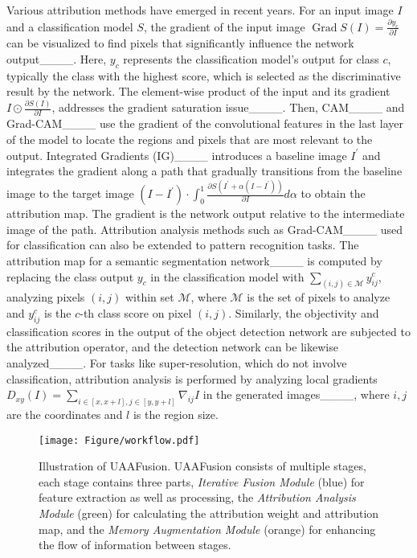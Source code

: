 Various attribution methods have emerged in recent years. 
For an input image $I$ and a classification model $S$, the gradient of the input image $\operatorname{Grad}S(I)=\frac{\partial y_{c}}{\partial I}$ can be visualized to find pixels that significantly influence the network output____. Here, $y_c$ represents the classification model's output for class $c$, typically the class with the highest score, which is selected as the discriminative result by the network.
The element-wise product of the input and its gradient $I \odot \frac{\partial S(I)}{\partial I}$, addresses the gradient saturation issue____. 
Then, CAM____ and Grad-CAM____ use the gradient of the convolutional features in the last layer of the model to locate the regions and pixels that are most relevant to the output. 
Integrated Gradients (IG)____ introduces a baseline image $I^{\prime}$ and integrates the gradient along a path that gradually transitions from the baseline image to the target image $\left(I-I^{\prime}\right) \cdot \int_0^1 \frac{\partial S\left(I^{\prime}+\alpha\left(I-I^{\prime}\right)\right)}{\partial I} d \alpha$ to obtain the attribution map. 
The gradient is the network output relative to the intermediate image of the path. Attribution analysis methods such as Grad-CAM____ used for classification can also be extended to pattern recognition tasks. 
The attribution map for a semantic segmentation network____ is computed by replacing the class output $y_c$ in the classification model with $\sum_{(i, j) \in \mathcal{M}} y_{ij}^c$, analyzing pixels $(i,j)$ within set $\mathcal{M}$, where $\mathcal{M}$ is the set of pixels to analyze and $y_{i j}^c$ is the $c$-th class score on pixel $(i,j)$. 
Similarly, the objectivity and classification scores in the output of the object detection network are subjected to the attribution operator, and the detection network can be likewise analyzed____. 
For tasks like super-resolution, which do not involve classification, attribution analysis is performed by analyzing local gradients $D_{x y}(I)=\sum_{i \in[x, x+l], j \in[y, y+l]} \nabla_{i j} I$ in the generated images____, where $i,j$ are the coordinates and $l$ is the region size.




\begin{figure*}[!]
	\centering
	\texttt{[image: Figure/workflow.pdf]}
	\caption{{Illustration of UAAFusion.} UAAFusion consists of multiple stages, each stage contains three parts, \textit{Iterative Fusion Module} (blue) for feature extraction as well as processing, the \textit{Attribution Analysis Module} (green) for calculating the attribution weight and attribution map, and the \textit{Memory Augmentation Module} (orange) for enhancing the flow of information between stages.}
	\label{fig:AUIF_net}
\end{figure*}